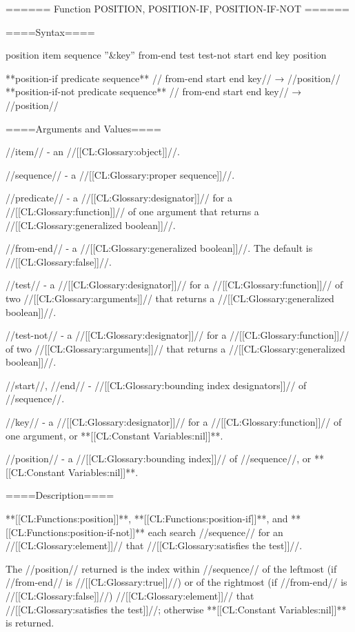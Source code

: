 ====== Function POSITION, POSITION-IF, POSITION-IF-NOT ======

====Syntax====

\DefunWithValues position {item sequence ''&key'' from-end test test-not start end key} {position}

**position-if {predicate sequence** //\key} from-end start end key// → //position// **position-if-not {predicate sequence** //\key} from-end start end key// → //position//

====Arguments and Values====

//item// - an //[[CL:Glossary:object]]//.

//sequence// - a //[[CL:Glossary:proper sequence]]//.

//predicate// - a //[[CL:Glossary:designator]]// for a //[[CL:Glossary:function]]// of one argument that returns a //[[CL:Glossary:generalized boolean]]//.

//from-end// - a //[[CL:Glossary:generalized boolean]]//. The default is //[[CL:Glossary:false]]//.

//test// - a //[[CL:Glossary:designator]]// for a //[[CL:Glossary:function]]// of two //[[CL:Glossary:arguments]]// that returns a //[[CL:Glossary:generalized boolean]]//.

//test-not// - a //[[CL:Glossary:designator]]// for a //[[CL:Glossary:function]]// of two //[[CL:Glossary:arguments]]// that returns a //[[CL:Glossary:generalized boolean]]//.

//start//, //end// - //[[CL:Glossary:bounding index designators]]// of //sequence//. 

//key// - a //[[CL:Glossary:designator]]// for a //[[CL:Glossary:function]]// of one argument, or **[[CL:Constant Variables:nil]]**.

//position// - a //[[CL:Glossary:bounding index]]// of //sequence//, or **[[CL:Constant Variables:nil]]**.

====Description====

**[[CL:Functions:position]]**, **[[CL:Functions:position-if]]**, and **[[CL:Functions:position-if-not]]** each search //sequence// for an //[[CL:Glossary:element]]// that //[[CL:Glossary:satisfies the test]]//.

The //position// returned is the index within //sequence// of the leftmost (if //from-end// is //[[CL:Glossary:true]]//) or of the rightmost (if //from-end// is //[[CL:Glossary:false]]//) //[[CL:Glossary:element]]// that //[[CL:Glossary:satisfies the test]]//; otherwise **[[CL:Constant Variables:nil]]** is returned.

